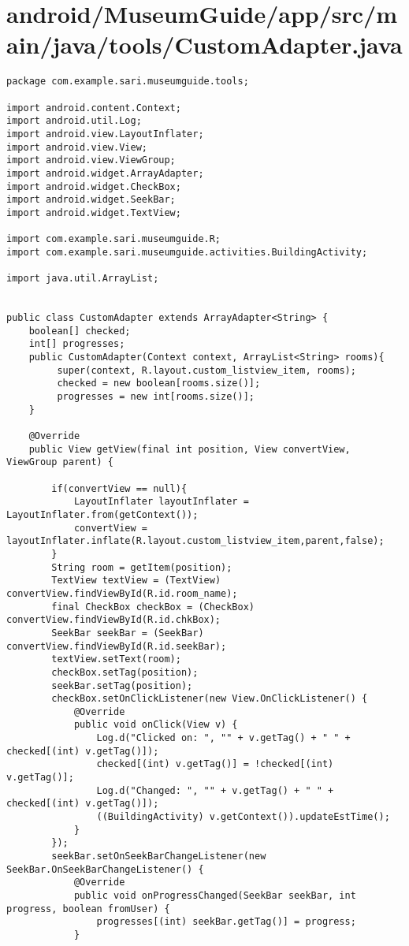 \section{android/MuseumGuide/app/src/main/java/tools/CustomAdapter.java}
\begin{lstlisting}package com.example.sari.museumguide.tools;

import android.content.Context;
import android.util.Log;
import android.view.LayoutInflater;
import android.view.View;
import android.view.ViewGroup;
import android.widget.ArrayAdapter;
import android.widget.CheckBox;
import android.widget.SeekBar;
import android.widget.TextView;

import com.example.sari.museumguide.R;
import com.example.sari.museumguide.activities.BuildingActivity;

import java.util.ArrayList;


public class CustomAdapter extends ArrayAdapter<String> {
    boolean[] checked;
    int[] progresses;
    public CustomAdapter(Context context, ArrayList<String> rooms){
         super(context, R.layout.custom_listview_item, rooms);
         checked = new boolean[rooms.size()];
         progresses = new int[rooms.size()];
    }

    @Override
    public View getView(final int position, View convertView, ViewGroup parent) {

        if(convertView == null){
            LayoutInflater layoutInflater = LayoutInflater.from(getContext());
            convertView = layoutInflater.inflate(R.layout.custom_listview_item,parent,false);
        }
        String room = getItem(position);
        TextView textView = (TextView) convertView.findViewById(R.id.room_name);
        final CheckBox checkBox = (CheckBox) convertView.findViewById(R.id.chkBox);
        SeekBar seekBar = (SeekBar) convertView.findViewById(R.id.seekBar);
        textView.setText(room);
        checkBox.setTag(position);
        seekBar.setTag(position);
        checkBox.setOnClickListener(new View.OnClickListener() {
            @Override
            public void onClick(View v) {
                Log.d("Clicked on: ", "" + v.getTag() + " " + checked[(int) v.getTag()]);
                checked[(int) v.getTag()] = !checked[(int) v.getTag()];
                Log.d("Changed: ", "" + v.getTag() + " " + checked[(int) v.getTag()]);
                ((BuildingActivity) v.getContext()).updateEstTime();
            }
        });
        seekBar.setOnSeekBarChangeListener(new SeekBar.OnSeekBarChangeListener() {
            @Override
            public void onProgressChanged(SeekBar seekBar, int progress, boolean fromUser) {
                progresses[(int) seekBar.getTag()] = progress;
            }


\end{lstlisting}
